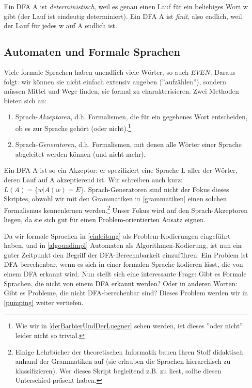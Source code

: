 Ein DFA A ist \emph{deterministisch}, weil es genau einen Lauf
für ein beliebiges Wort w gibt (der Lauf ist eindeutig determiniert).
Ein DFA A ist \emph{finit}, also endlich, weil der Lauf für jedes w auf A endlich ist.

\subsection{Automaten und Formale Sprachen}

Viele formale Sprachen haben unendlich viele Wörter,
so auch $EVEN$.
Daraus folgt: wir können sie nicht einfach extensiv angeben (''aufzählen''),
sondern müssen Mittel und Wege finden, sie formal zu charakterisieren.
Zwei Methoden bieten sich an:
\begin{enumerate}
    \item Sprach-\emph{Akzeptoren}, d.h. Formalismen,
        die für ein gegebenes Wort entscheiden,
        ob es zur Sprache gehört (oder nicht).\footnote{
            Wie wir in \autoref{derBarbierUndDerLuegner} sehen werden,
            ist dieses ''oder nicht'' leider nicht so trivial.}

    \item Sprach-\emph{Generatoren}, d.h. Formalismen,
        mit denen alle Wörter einer Sprache abgeleitet werden können
        (und nicht mehr).
\end{enumerate}


Ein DFA A ist so ein Akzeptor:
er spezifiziert eine Sprache L aller der Wörter,
deren Lauf auf A akzeptierend ist.
Wir schreiben auch kurz: $L(A) = \{w|A(w) = E\}$.
Sprach-Generatoren sind nicht der Fokus dieses Skriptes, obwohl wir mit den Grammatiken
in \autoref{grammatiken} einen solchen Formalismus kennenlernen werden.\footnote{
Einige Lehrbücher der theoretischen Informatik bauen Ihren Stoff didaktisch anhand der Grammatiken
auf (sie erlauben die Sprachen hierarchisch zu klassifizieren).
Wer dieses Skript begleitend z.B. zu \cite{schoening} liest,
sollte diesen Unterschied präsent haben.}
Unser Fokus wird auf den Sprach-Akzeptoren liegen,
da sie sich gut für einen Problem-orientierten Ansatz eignen.

Da wir formale Sprachen in \autoref{einleitung} als Problem-Kodierungen eingeführt haben,
und in \autoref{algoundimpl} Automaten als Algorithmen-Kodierung,
ist nun ein guter Zeitpunkt den Begriff der DFA-Berechnbarkeit einzuführen:
Ein Problem ist DFA-berechenbar,
wenn es sich in einer formalen Sprache kodieren lässt,
die von einem DFA erkannt wird.
Nun stellt sich eine interessante Frage:
Gibt es Formale Sprachen, die nicht von einem DFA erkannt werden?
Oder in anderen Worten: Gibt es Probleme, die nicht DFA-berechenbar sind?
Dieses Problem werden wir in \autoref{pumping} weiter vertiefen.


